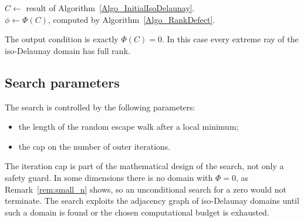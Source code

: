 \documentclass{amsart}
\begin{document}
\begin{algorithm}
\(C\leftarrow\) result of Algorithm~\ref{Algo_InitialIsoDelaunay}.\\
\(\phi\leftarrow\Phi(C)\), computed by Algorithm~\ref{Algo_RankDefect}.\\
\caption{Search for an iso-Delaunay domain with full-rank rays}
\label{Algo_FullRankSearch}
\end{algorithm}

The output condition is exactly \(\Phi(C)=0\).  In this case every extreme ray
of the iso-Delaunay domain has full rank.

\subsection{Search parameters}

The search is controlled by the following parameters:
\begin{itemize}[leftmargin=2em]
  \item the length of the random escape walk after a local minimum;
  \item the cap on the number of outer iterations.
\end{itemize}

The iteration cap is part of the mathematical design of the search, not only a
safety guard.  In some dimensions there is no domain with \(\Phi=0\), as
Remark~\ref{rem:small_n} shows, so an
unconditional search for a zero would not terminate.  The search exploits the
adjacency graph of iso-Delaunay domains until such a domain is found or the
chosen computational budget is exhausted.
\end{document}
